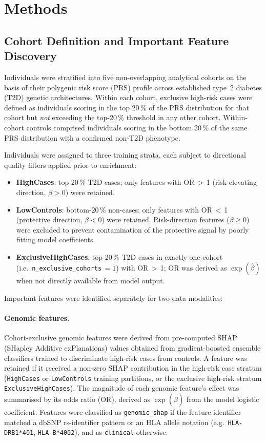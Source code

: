 \section*{Methods}

\subsection*{Cohort Definition and Important Feature Discovery}

Individuals were stratified into five non-overlapping analytical cohorts on the basis of their polygenic risk score (PRS) profile across established type~2 diabetes (T2D) genetic architectures.
Within each cohort, exclusive high-risk cases were defined as individuals scoring in the top 20\,\% of the PRS distribution for that cohort but \emph{not} exceeding the top-20\,\% threshold in any other cohort.
Within-cohort controls comprised individuals scoring in the bottom 20\,\% of the same PRS distribution with a confirmed non-T2D phenotype.

Individuals were assigned to three training strata, each subject to directional quality filters applied prior to enrichment:
\begin{itemize}
  \item \textbf{HighCases}: top-20\,\% T2D cases; only features with OR\,$>$\,1 (risk-elevating direction, $\beta > 0$) were retained.
  \item \textbf{LowControls}: bottom-20\,\% non-cases; only features with OR\,$<$\,1 (protective direction, $\beta < 0$) were retained. Risk-direction features ($\beta \geq 0$) were excluded to prevent contamination of the protective signal by poorly fitting model coefficients.
  \item \textbf{ExclusiveHighCases}: top-20\,\% T2D cases in exactly one cohort (i.e.\ \texttt{n\_exclusive\_cohorts}\,$= 1$) with OR\,$>$\,1; OR was derived as $\exp(\hat\beta)$ when not directly available from model output.
\end{itemize}

Important features were identified separately for two data modalities:

\paragraph{Genomic features.}
Cohort-exclusive genomic features were derived from pre-computed SHAP (SHapley Additive exPlanations) values obtained from gradient-boosted ensemble classifiers trained to discriminate high-risk cases from controls.
A feature was retained if it received a non-zero SHAP contribution in the high-risk case stratum (\texttt{HighCases} or \texttt{LowControls} training partitions, or the exclusive high-risk stratum \texttt{ExclusiveHighCases}).
The magnitude of each genomic feature's effect was summarised by its odds ratio (OR), derived as $\exp(\hat\beta)$ from the model logistic coefficient.
Features were classified as \texttt{genomic\_shap} if the feature identifier matched a dbSNP rs-identifier pattern or an HLA allele notation (e.g.\ \texttt{HLA-DRB1*401}, \texttt{HLA-B*4002}), and as \texttt{clinical} otherwise.

